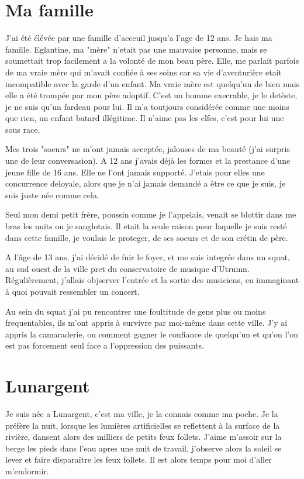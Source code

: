 \documentclass[10pt,a4paper,twoside,twocolumn,openany]{book}
\begin{document}
\section{Ma famille}

J'ai été élévée par une famille d'acceuil jusqu'a l'age de 12 ans. Je hais ma famille.
Eglantine, ma "mère" n'etait pas une mauvaise personne, mais se soumettait trop
facilement a la volonté de mon beau père. Elle, me parlait parfois 
de ma vraie mère qui m'avait confiée à ses soins car sa vie d'aventurière etait incompatible
avec la garde d'un enfant. Ma vraie mère est quelqu'un de bien mais elle a été trompée par mon
père adoptif. C'est un homme execrable, je le detèste, je ne suis qu'un fardeau pour lui. Il 
m'a toutjours considérée comme une moins que rien, un enfant batard illégitime. Il n'aime pas
les elfes, c'est pour lui une sous race.

Mes trois "soeurs" ne m'ont jamais acceptée, jalouses de ma beauté (j'ai surpris une
de leur conversasion). A 12 ans j'avais déjà les formes et la prestance d'une jeune fille de 16
ans. Elle ne l'ont jamais supporté. J'etais pour elles une concurrence deloyale, alors que je n'ai
jamais demandé a être ce que je suis, je suis juste née comme cela.

Seul mon demi petit frère, poussin comme je l'appelais, venait se blottir dans me bras
les nuits ou je sanglotais. Il etait la seule raison pour laquelle je suis resté dans cette famille,
je voulais le proteger, de ses soeurs et de son crétin de père.

A l'âge de 13 ans, j'ai décidé de fuir le foyer, et me suis integrée dans un squat, au sud ouest de la ville
pret du conservatoire de musique d'Utrumn.
Régulièrement, j'allais objserver l'entrée et la sortie des musiciens, en immaginant à quoi pouvait ressembler
un concert. 

Au sein du squat j'ai pu rencontrer une foultitude de gens plus ou moins frequentables, ils m'ont appris
à survivre par moi-même dans cette ville. J'y ai appris la camaraderie, ou comment gagner le confiance de quelqu'un
et qu'on l'on est pas forcement seul face a l'oppression des puissants.


\section{Lunargent}

Je suis née a Lunargent, c'est ma ville, je la connais comme ma poche. Je la préfère la nuit, lorsque
les lumières artificielles se reflettent à la surface de la rivière, dansent alors des milliers de petits feux follets. 
J'aime m'assoir sur la berge les pieds dans l'eau apres une nuit de travail, j'observe alors la soleil
se lever et faire disparaître les feux follets. Il est alors temps pour moi d'aller m'endormir.
\end{document}
